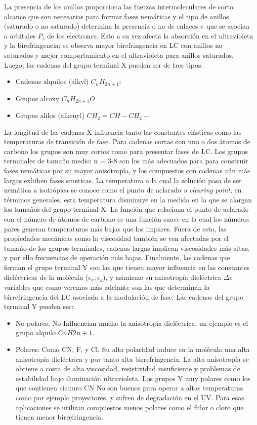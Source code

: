 La presencia de los anillos proporciona las fuerzas intermoleculares de corto alcance que
son necesarias para formar fases nemáticas y el tipo de anillos
(saturado o no saturado) determina la presencia o no de enlaces $\pi$
que se asocian a orbitales $P_z$ de los electrones. Esto a su vez
afecta la absorción en el ultravioleta y la birefringencia; se observa mayor
birefringencia en LC con anillos no saturados y mejor comportamiento
en el ultravioleta para anillos saturados.  Luego, las cadenas del
grupo terminal X pueden ser de tres tipos:
\begin{itemize}
\item Cadenas alquilos (alkyl)  $C_nH_{2n+1}$: 
\item Grupos alcoxy $C_nH_{2n+1}O$
\item Grupos alilos (alkenyl) $CH_2=CH-CH_2-$
\end{itemize}
 La longitud de las cadenas X influencia tanto las constantes elásticas
 como las temperaturas de transición de fase. Para cadenas cortas con
 uno o dos átomos de carbono los grupos son muy cortos como para
 presentar fases de LC. Los grupos terminales de tamaño medio: n = 3-8
 son los más adecuados para para construir fases nemáticas por su
 mayor anisotropía, y los compuestos con cadenas aún más largas
 exhiben fases smeticas. La temperatura a la cual la solución pasa de
 ser nemática a isotrópica se conoce como el punto de aclarado o
 \textit{clearing point}, en términos generales, esta temperatura
 disminuye en la medida en la que se alargan los tamaños del 
 grupo terminal X. La función que relaciona el punto de aclarado con
 el número de átomos de carbono es una función suave en la cual los
 números pares generan temperaturas más bajas que los impares. Fuera
 de esto, las propiedades mecánicas como la viscosidad también se ven
 afectadas por el tamaño de los grupos terminales, cadenas
 largas implican viscosidades más altas, y por ello frecuencias de
 operación más bajas. 
Finalmente, las cadenas que forman el grupo terminal Y son las que
tienen mayor influencia en las constantes dieléctricas de la molécula
($\epsilon_x,\epsilon_y$), y asimismo su anisotropía dieléctrica
$\Delta\epsilon$ variables que como veremos más adelante son las que
determinan la birrefringencia del LC asociada a la modulación de fase.
Las cadenas del grupo terminal Y pueden ser:
\begin{itemize}
\item No polares: No Influencian mucho la anisotropía dieléctrica, un
  ejemplo es el grupo alquilo $CnH2n+1$.
\item Polares:  Como CN, F, y Cl. Su alta polaridad induce en la
  molécula una alta anisotropía dieléctrica y por tanto alta
  birrefringencia. La alta anisotropía se obtiene a costa de alta viscosidad, resistividad
  insuficiente y problemas de estabilidad bajo iluminación 
  ultravioleta. Los grupos Y muy polares como los que contienen
  cianuro CN No son buenos para operar a  altas temperaturas como por
  ejemplo proyectores, y sufren de degradación en el UV. Para esas
  aplicaciones se utilizan compuestos menos polares como el flúor o
  cloro que tienen menor birrefringencia.
\end{itemize}

